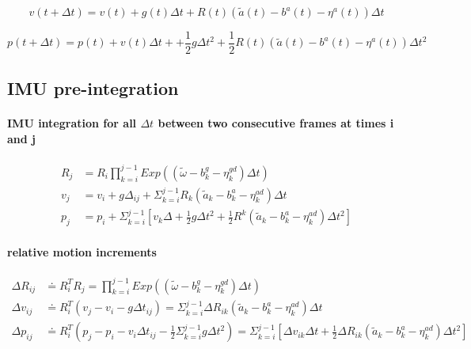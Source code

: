 \documentclass[10pt,a4paper]{article}
\begin{document}
\begin{equation}
v(t+\Delta t) =v(t) + g(t) \Delta t + R(t)(\tilde{a}(t) -b^a(t) - \eta^a(t)) \Delta t
\end{equation}

\begin{equation}
p(t+\Delta t) = p(t) + v(t)\Delta t + + \frac{1}{2}g\Delta t^2
 + \frac{1}{2} R(t)(\tilde{a}(t) -b^a(t) - \eta^a(t)) \Delta t^2
\end{equation}

\subsection{IMU pre-integration}

\paragraph{IMU integration for all $\Delta t$ between two consecutive frames at times i and j}
\begin{subequations}
\begin{align}
	R_j &= R_i \prod_{k=i}^{j-1} Exp((\tilde{\omega} - b^g_k - \eta^{gd}_k) \Delta t) \\
	v_j &= v_i + g\Delta_{ij} + \Sigma_{k=i}^{j-1} R_k(\tilde{a}_k - b_k^a - \eta_k^{ad}) \Delta t \\
	p_j &= p_i + \Sigma_{k=i}^{j-1}[v_k\Delta + \frac{1}{2}g \Delta t^2 +
	\frac{1}{2} R^k (\tilde{a}_k - b_k^a - \eta_k^{ad}) \Delta t^2]
\end{align}
\end{subequations}

\paragraph{relative motion increments}
\begin{subequations}
	\begin{align}
	\Delta R_{ij} & \doteq R_i^T R_j = \prod_{k=i}^{j-1} Exp((\tilde{\omega} - b^g_k - \eta^{gd}_k) \Delta t) \\
	\Delta v_{ij} &\doteq R_i^T(v_j - v_i -g \Delta t_{ij}) = \Sigma_{k=i}^{j-1} \Delta R_{ik}(\tilde{a}_k - b_k^a -\eta_k^{ad}) \Delta t\\
	\Delta p_{ij} &\doteq R_i^T (p_j - p_i - v_i\Delta t_{ij} - \frac{1}{2} \Sigma_{k=i}^{j-1}g\Delta t^2)= 
	\Sigma_{k=i}^{j-1}[\Delta v_{ik}\Delta t + \frac{1}{2}\Delta R_{ik}(\tilde{a}_k - b_k^a -\eta_k^{ad}) \Delta t^2]
	\end{align}
\end{subequations}
\end{document}
